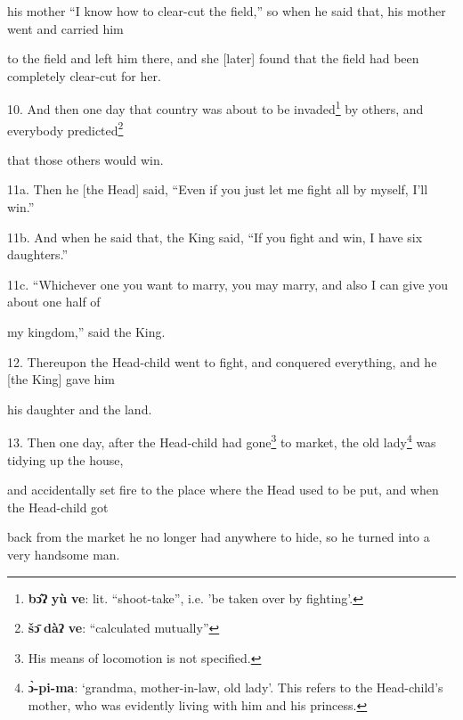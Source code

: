 his mother ``I know how to clear-cut the field,'' so when he said that, his mother
went and carried him

to the field and left him there, and she [later] found that the field had been
completely clear-cut for her.

10. And then one day that country was about to be invaded\footnote{\textbf{bɔ̂ʔ} \textbf{yù} \textbf{ve}: lit. ``shoot-take'', i.e. 'be taken over by fighting'.} by others, and everybody
predicted\footnote{\textbf{šɔ̄} \textbf{dàʔ} \textbf{ve}: ``calculated mutually''}

that those others would win.

11a. Then he [the Head] said, ``Even if you just let me fight all by myself, I'll
win.''

11b. And when he said that, the King said, ``If you fight and win, I have six daughters.''

11c. ``Whichever one you want to marry, you may marry, and also I can give you
about one half of

my kingdom,'' said the King.

12. Thereupon the Head-child went to fight, and conquered everything, and he [the
King] gave him

his daughter and the land.

13. Then one day, after the Head-child had gone\footnote{His means of locomotion is not specified.} to market, the old lady\footnote{\textbf{ɔ̀-pi-ma}: `grandma, mother-in-law, old lady'. This refers to the Head-child's mother, who was evidently living with him and his princess.}
was tidying up the house,

and accidentally set fire to the place where the Head used to be put, and when
the Head-child got

back from the market he no longer had anywhere to hide, so he turned into a very
handsome man.

